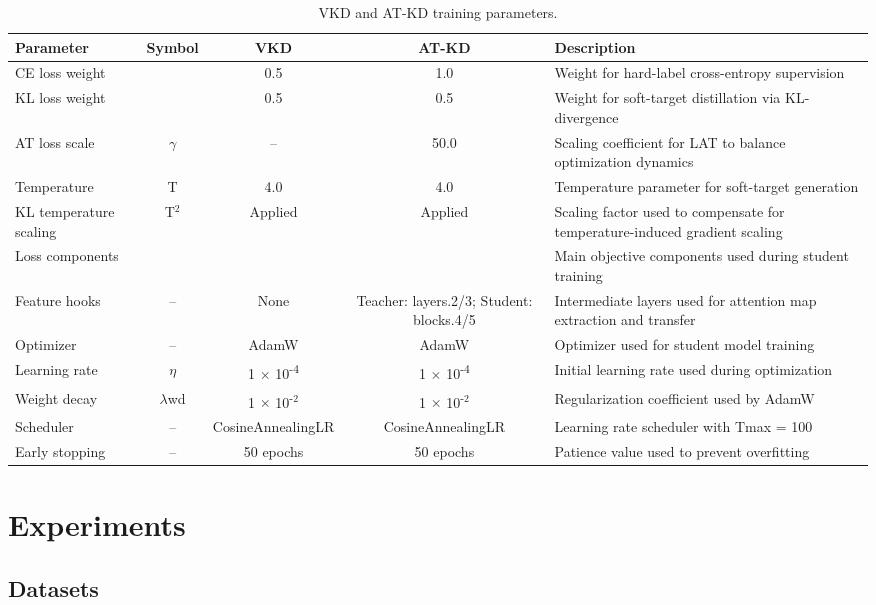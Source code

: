 \documentclass[preprint,review,12pt]{elsarticle}
\begin{document}
\begin{table}[tbp]
\centering
\caption{VKD and AT-KD training parameters.}
\label{tab:train_params}
\footnotesize
\renewcommand{\arraystretch}{1.2}
\setlength{\tabcolsep}{3pt}
\begin{tabular}{l c c c L{0.36\textwidth}}
\toprule
\textbf{Parameter} & \textbf{Symbol} & \textbf{VKD} & \textbf{AT-KD} & \textbf{Description} \\
\midrule
CE loss weight &  & 0.5 & 1.0 & Weight for hard-label cross-entropy supervision \\
KL loss weight &  & 0.5 & 0.5 & Weight for soft-target distillation via KL-divergence \\
AT loss scale & $\gamma$ & -- & 50.0 & Scaling coefficient for LAT to balance optimization dynamics \\
Temperature & T & 4.0 & 4.0 & Temperature parameter for soft-target generation \\
KL temperature scaling & T$^{2}$ & Applied & Applied & Scaling factor used to compensate for temperature-induced gradient scaling \\
Loss components &  &  &  & Main objective components used during student training \\
Feature hooks & -- & None & Teacher: layers.2/3; Student: blocks.4/5 & Intermediate layers used for attention map extraction and transfer \\
Optimizer & -- & AdamW & AdamW & Optimizer used for student model training \\
Learning rate & $\eta$ & 1 $\times$ 10\textsuperscript{-}\textsuperscript{4} & 1 $\times$ 10\textsuperscript{-}\textsuperscript{4} & Initial learning rate used during optimization \\
Weight decay & $\lambda$wd & 1 $\times$ 10\textsuperscript{-}$^{2}$ & 1 $\times$ 10\textsuperscript{-}$^{2}$ & Regularization coefficient used by AdamW \\
Scheduler & -- & CosineAnnealingLR & CosineAnnealingLR & Learning rate scheduler with Tmax = 100 \\
Early stopping & -- & 50 epochs & 50 epochs & Patience value used to prevent overfitting \\
\bottomrule
\end{tabular}
\end{table}

\section{Experiments}
\subsection{Datasets}
\end{document}
